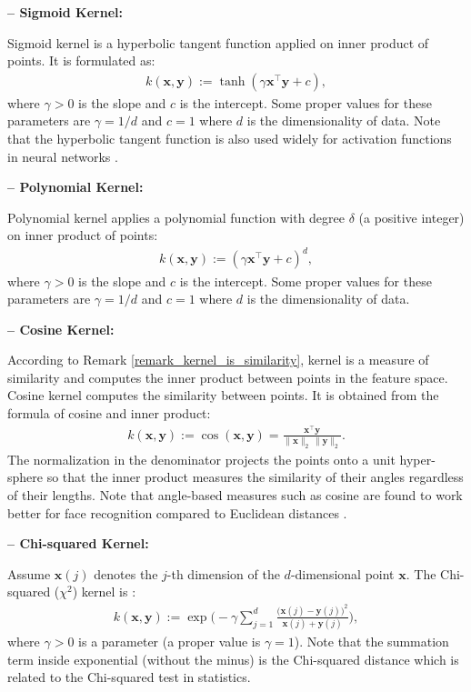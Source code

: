 \documentclass[lang=cn,10pt]{gorgeousnbook}
\numberwithin{equation}{section}%
\numberwithin{figure}{section}%
\begin{document}
\textbf{-- Sigmoid Kernel:}

Sigmoid kernel is a hyperbolic tangent function applied on inner product of points. It is formulated as:
\begin{align}
k(\boldsymbol{x}, \boldsymbol{y}) := \tanh(\gamma \boldsymbol{x}^\top \boldsymbol{y} + c),
\end{align}
where $\gamma >0$ is the slope and $c$ is the intercept. Some proper values for these parameters are $\gamma=1/d$ and $c=1$ where $d$ is the dimensionality of data.
Note that the hyperbolic tangent function is also used widely for activation functions in neural networks \cite{goodfellow2016deep}. 

\textbf{-- Polynomial Kernel:}

Polynomial kernel applies a polynomial function with degree $\delta$ (a positive integer) on inner product of points:
\begin{align}
k(\boldsymbol{x}, \boldsymbol{y}) := (\gamma \boldsymbol{x}^\top \boldsymbol{y} + c)^d,
\end{align}
where $\gamma >0$ is the slope and $c$ is the intercept. Some proper values for these parameters are $\gamma=1/d$ and $c=1$ where $d$ is the dimensionality of data.

\textbf{-- Cosine Kernel:}

According to Remark \ref{remark_kernel_is_similarity}, kernel is a measure of similarity and computes the inner product between points in the feature space. 
Cosine kernel computes the similarity between points. It is obtained from the formula of cosine and inner product:
\begin{align}\label{equation_cosine_kernel}
k(\boldsymbol{x}, \boldsymbol{y}) := \cos(\boldsymbol{x}, \boldsymbol{y}) = \frac{\boldsymbol{x}^\top \boldsymbol{y}}{\|\boldsymbol{x}\|_2\, \|\boldsymbol{y}\|_2}.
\end{align}
The normalization in the denominator projects the points onto a unit hyper-sphere so that the inner product measures the similarity of their angles regardless of their lengths. 
Note that angle-based measures such as cosine are found to work better for face recognition compared to Euclidean distances \cite{perlibakas2004distance}.

\textbf{-- Chi-squared Kernel:}

Assume $\boldsymbol{x}(j)$ denotes the $j$-th dimension of the $d$-dimensional point $\boldsymbol{x}$.
The Chi-squared ($\chi^2$) kernel is \cite{zhang2007local}:
\begin{align}
k(\boldsymbol{x}, \boldsymbol{y}) := \exp\Big(\!\!-\!\gamma \sum_{j=1}^d \frac{\big(\boldsymbol{x}(j) - \boldsymbol{y}(j)\big)^2}{\boldsymbol{x}(j) + \boldsymbol{y}(j)}\Big),
\end{align}
where $\gamma >0$ is a parameter (a proper value is $\gamma=1$). 
Note that the summation term inside exponential (without the minus) is the Chi-squared distance which is related to the Chi-squared test in statistics. 
\end{document}
